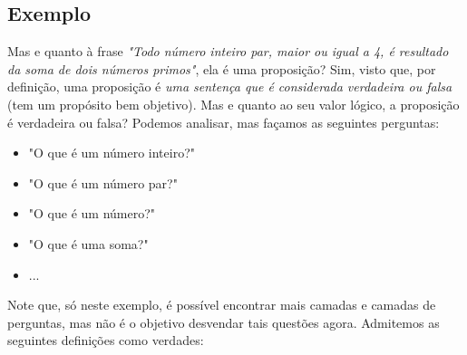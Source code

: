 \documentclass{article}
\begin{document}
\subsection{Exemplo}
Mas e quanto à frase \emph{"Todo número inteiro par, maior ou igual a 4, é resultado da soma de dois números primos"}, ela é uma proposição? Sim, visto que, por definição, uma proposição é \emph{uma sentença que é considerada verdadeira ou falsa} (tem um propósito bem objetivo). Mas e quanto ao seu valor lógico, a proposição é verdadeira ou falsa? Podemos analisar, mas façamos as seguintes perguntas:
\begin{itemize}
    \item "O que é um número inteiro?"
    \item "O que é um número par?"
    \item "O que é um número?"
    \item "O que é uma soma?"
    \item ...
\end{itemize}
Note que, só neste exemplo, é possível encontrar mais camadas e camadas de perguntas, mas não é o objetivo desvendar tais questões agora. Admitemos as seguintes definições como verdades:
\end{document}
